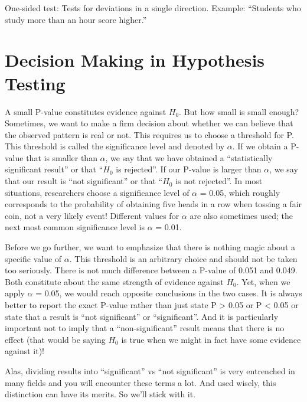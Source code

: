 \documentclass[
  letterpaper,
]{book}
\begin{document}
One-sided test: Tests for deviations in a single direction. Example:
``Students who study more than an hour score higher.''

\section*{Decision Making in Hypothesis
Testing}\label{decision-making-in-hypothesis-testing}


A small P-value constitutes evidence against \(H_0\). But how small is
small enough? Sometimes, we want to make a firm decision about whether
we can believe that the observed pattern is real or not. This requires
us to choose a threshold for P. This threshold is called the
significance level and denoted by \(\alpha\). If we obtain a P-value
that is smaller than \(\alpha\), we say that we have obtained a
``statistically significant result'' or that ``\(H_0\) is rejected''. If
our P-value is larger than \(\alpha\), we say that our result is ``not
significant'' or that ``\(H_0\) is not rejected''. In most situations,
researchers choose a significance level of \(\alpha\) = 0.05, which
roughly corresponds to the probability of obtaining five heads in a row
when tossing a fair coin, not a very likely event! Different values for
\(\alpha\) are also sometimes used; the next most common significance
level is \(\alpha\) = 0.01.

Before we go further, we want to emphasize that there is nothing magic
about a specific value of \(\alpha\). This threshold is an arbitrary
choice and should not be taken too seriously. There is not much
difference between a P-value of 0.051 and 0.049. Both constitute about
the same strength of evidence against \(H_0\). Yet, when we apply
\(\alpha\) = 0.05, we would reach opposite conclusions in the two cases.
It is always better to report the exact P-value rather than just state P
\textgreater{} 0.05 or P \textless{} 0.05 or state that a result is
``not significant'' or ``significant''. And it is particularly important
not to imply that a ``non-significant'' result means that there is no
effect (that would be saying \(H_0\) is true when we might in fact have
some evidence against it)!

Alas, dividing results into ``significant'' vs ``not significant'' is
very entrenched in many fields and you will encounter these terms a lot.
And used wisely, this distinction can have its merits. So we'll stick
with it.
\end{document}
